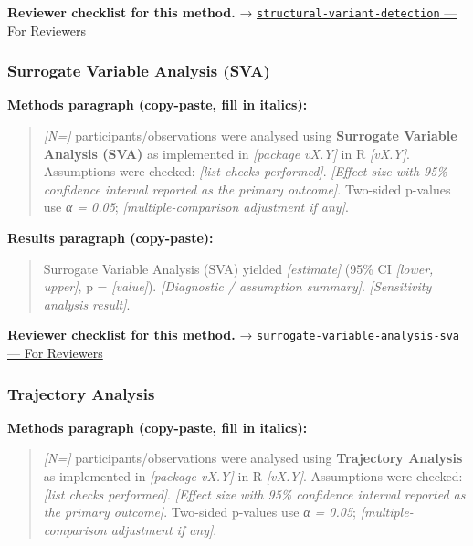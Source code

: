 \documentclass[
]{article}
\begin{document}
\textbf{Reviewer checklist for this method.} →
\href{../chapters/12-bioinformatics/structural-variant-detection.Rmd\#for-reviewers}{\texttt{structural-variant-detection}
--- For Reviewers}

\subsubsection{Surrogate Variable Analysis
(SVA)}\label{surrogate-variable-analysis-sva}

\textbf{Methods paragraph (copy-paste, fill in italics):}

\begin{quote}
\emph{{[}N={]}} participants/observations were analysed using
\textbf{Surrogate Variable Analysis (SVA)} as implemented in
\emph{{[}package vX.Y{]}} in R \emph{{[}vX.Y{]}}. Assumptions were
checked: \emph{{[}list checks performed{]}}. \emph{{[}Effect size with
95\% confidence interval reported as the primary outcome{]}}. Two-sided
p-values use \emph{α = 0.05}; \emph{{[}multiple-comparison adjustment if
any{]}}.
\end{quote}

\textbf{Results paragraph (copy-paste):}

\begin{quote}
Surrogate Variable Analysis (SVA) yielded \emph{{[}estimate{]}} (95\% CI
\emph{{[}lower, upper{]}}, p = \emph{{[}value{]}}). \emph{{[}Diagnostic
/ assumption summary{]}}. \emph{{[}Sensitivity analysis result{]}}.
\end{quote}

\textbf{Reviewer checklist for this method.} →
\href{../chapters/12-bioinformatics/surrogate-variable-analysis-sva.Rmd\#for-reviewers}{\texttt{surrogate-variable-analysis-sva}
--- For Reviewers}

\subsubsection{Trajectory Analysis}\label{trajectory-analysis}

\textbf{Methods paragraph (copy-paste, fill in italics):}

\begin{quote}
\emph{{[}N={]}} participants/observations were analysed using
\textbf{Trajectory Analysis} as implemented in \emph{{[}package vX.Y{]}}
in R \emph{{[}vX.Y{]}}. Assumptions were checked: \emph{{[}list checks
performed{]}}. \emph{{[}Effect size with 95\% confidence interval
reported as the primary outcome{]}}. Two-sided p-values use \emph{α =
0.05}; \emph{{[}multiple-comparison adjustment if any{]}}.
\end{quote}
\end{document}
